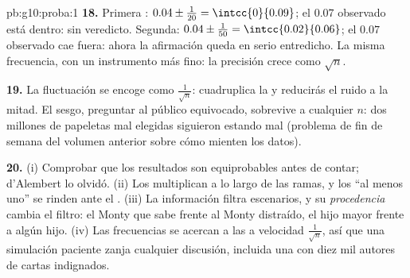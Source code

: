 \begin{solution}{pb:g10:proba:1}
\textbf{18.} Primera : 
$0.04 \pm \frac{1}{20} = \intcc{0}{0.09}$; el $0.07$ observado está
dentro: sin veredicto. Segunda: $0.04 \pm \frac{1}{50} =
\intcc{0.02}{0.06}$; el $0.07$ observado cae fuera: ahora la afirmación
queda en serio entredicho. La misma frecuencia, con un instrumento más
fino: la precisión crece como $\sqrt n$.

\textbf{19.} La fluctuación se encoge como $\frac{1}{\sqrt n}$: cuadruplica
la  y reducirás el ruido a la mitad. El sesgo, preguntar al público
equivocado, sobrevive a cualquier $n$: dos millones de papeletas mal
elegidas siguieron estando mal (problema de fin de semana del volumen
anterior sobre cómo mienten los datos).

\textbf{20.} (i) Comprobar que los resultados son equiprobables antes de
contar; d'Alembert lo olvidó. (ii) Los  multiplican a lo largo de
las ramas, y los ``al menos uno'' se rinden ante el .
(iii) La información filtra escenarios, y su \emph{procedencia} cambia el
filtro: el Monty que sabe frente al Monty distraído, el hijo mayor frente
a algún hijo. (iv) Las frecuencias se acercan a las  a
velocidad $\frac{1}{\sqrt n}$, así que una simulación paciente zanja
cualquier discusión, incluida una con diez mil autores de cartas
indignados.
\end{solution}
